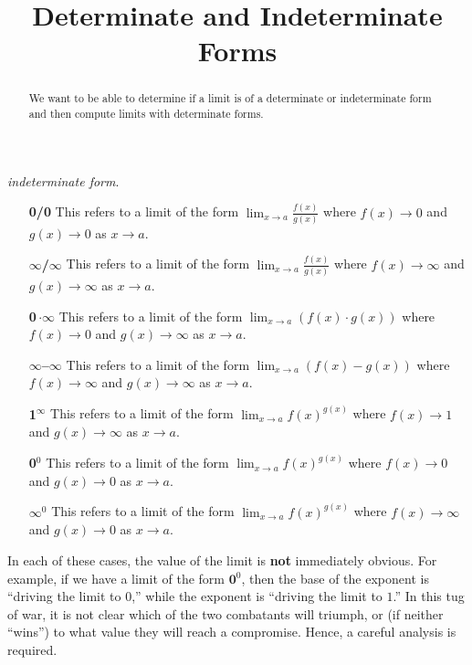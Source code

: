 \documentclass{ximera}
\title{Determinate and Indeterminate Forms}
\begin{document}
\begin{abstract}
  We want to be able to determine if a limit is of a determinate or indeterminate form and then compute limits with determinate forms.
\end{abstract}

\maketitle



\textit{indeterminate form}.

\begin{definition}\hfil
\begin{itemize}
\item[\textbf{0/0}] This refers to a limit of the form $\lim_{x\to a}
  \frac{f(x)}{g(x)}$ where $f(x)\to 0$ and $g(x)\to 0$ as $x\to a$.
\item[\textbf{$\pmb\infty$/$\pmb\infty$}] This refers to a limit of the form $\lim_{x\to a}
  \frac{f(x)}{g(x)}$ where $f(x)\to \infty$ and $g(x)\to \infty$ as $x\to a$.
\item[\textbf{0\,$\pmb{\cdot\infty}$}] This refers to a limit of the form $\lim_{x\to a}
  \left(f(x)\cdot g(x)\right)$ where $f(x)\to 0$ and $g(x)\to \infty$ as $x\to a$.
\item[\textbf{$\pmb\infty$--$\pmb\infty$}] This refers to a limit of the form $\lim_{x\to a}\left(
  f(x)-g(x)\right)$ where $f(x)\to \infty$ and $g(x)\to \infty$ as $x\to a$.

\item[\textbf{1$^{\pmb\infty}$}] This refers to a limit of the form $\lim_{x\to a}
  f(x)^{g(x)}$ where $f(x)\to 1$ and $g(x)\to \infty$ as $x\to a$.
\item[\textbf{0$^\text{0}$}] This refers to a limit of the form $\lim_{x\to a}
  f(x)^{g(x)}$ where $f(x)\to 0$ and $g(x)\to 0$ as $x\to a$.
\item[\textbf{$\pmb\infty^\text{0}$}] This refers to a limit of the form $\lim_{x\to a}
  f(x)^{g(x)}$ where $f(x)\to \infty$ and $g(x)\to 0$ as $x\to a$.
\end{itemize}
 
\end{definition}

In each of these cases, the value of the limit is \textbf{not}
immediately obvious.  For example, if we have a limit of the form
$\textbf{0$^\text{0}$}$, then the base of the exponent is ``driving the
limit to $0$,'' while the exponent is ``driving the limit to $1$.''
In this tug of war, it is not clear which of the two combatants will
triumph, or (if neither ``wins'') to what value they will reach a
compromise. Hence, a careful analysis is required.
\end{document}
